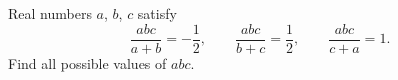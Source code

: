 Real numbers $a$, $b$, $c$ satisfy
\[
\dfrac{abc}{a+b}=-\dfrac{1}{2},\qquad\dfrac{abc}{b+c}=\dfrac{1}{2},\qquad\dfrac{abc}{c+a}=1 .
\]
Find all possible values of $abc$.
